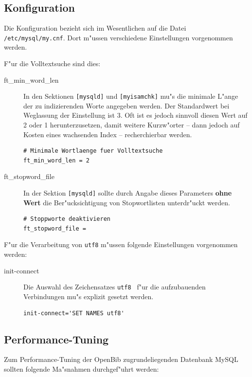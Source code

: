 \documentclass[11pt, twoside, a4paper, BCOR8mm, DIV12, bibtotoc,idxtotoc]{scrbook}
\begin{document}
\subsection{Konfiguration}

Die Konfiguration bezieht sich im Wesentlichen auf die Datei
\texttt{/etc/mysql/my.cnf}. Dort m"ussen verschiedene Einstellungen
vorgenommen werden.

F"ur die Volltextsuche sind dies:

\begin{description}
\item[ft\_min\_word\_len] In den Sektionen \texttt{[mysqld]} und
  \texttt{[myisamchk]} mu"s die minimale L"ange der zu indizierenden
  Worte angegeben werden. Der Standardwert bei Weglassung der
  Einstellung ist 3. Oft ist es jedoch sinnvoll diesen Wert auf 2 oder
  1 herunterzusetzen, damit weitere Kurzw"orter -- dann jedoch auf
  Kosten eines wachsenden Index -- recherchierbar werden.
\begin{verbatim}
# Minimale Wortlaenge fuer Volltextsuche
ft_min_word_len = 2
\end{verbatim}
\item[ft\_stopword\_file] In der Sektion \texttt{[mysqld]} sollte
  durch Angabe dieses Parameters \textbf{ohne Wert} die
  Ber"ucksichtigung von Stopwortlisten unterdr"uckt werden.
\begin{verbatim}
# Stoppworte deaktivieren
ft_stopword_file =
\end{verbatim}
\end{description}

F"ur die Verarbeitung von \texttt{utf8} m"ussen folgende Einstellungen vorgenommen werden:

\begin{description}
\item[init-connect] Die Auswahl des Zeichensatzes \texttt{utf8 } f"ur die aufzubauenden Verbindungen mu"s explizit gesetzt werden.
\begin{verbatim}
init-connect='SET NAMES utf8'
\end{verbatim}

\end{description}

\subsection{Performance-Tuning}

Zum Performance-Tuning der OpenBib zugrundeliegenden Datenbank MySQL
sollten folgende Ma"snahmen durchgef"uhrt werden:
\end{document}
